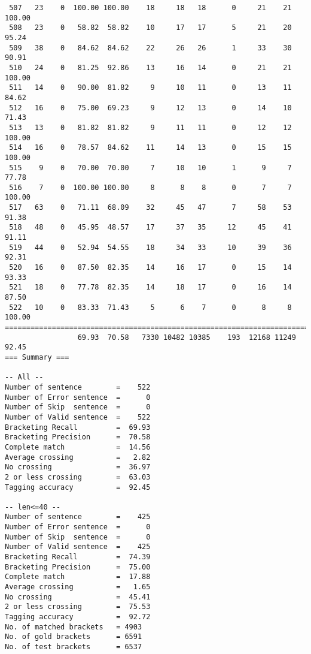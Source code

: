 \begin{verbatim}
 507   23    0  100.00 100.00    18     18   18      0     21    21   100.00
 508   23    0   58.82  58.82    10     17   17      5     21    20    95.24
 509   38    0   84.62  84.62    22     26   26      1     33    30    90.91
 510   24    0   81.25  92.86    13     16   14      0     21    21   100.00
 511   14    0   90.00  81.82     9     10   11      0     13    11    84.62
 512   16    0   75.00  69.23     9     12   13      0     14    10    71.43
 513   13    0   81.82  81.82     9     11   11      0     12    12   100.00
 514   16    0   78.57  84.62    11     14   13      0     15    15   100.00
 515    9    0   70.00  70.00     7     10   10      1      9     7    77.78
 516    7    0  100.00 100.00     8      8    8      0      7     7   100.00
 517   63    0   71.11  68.09    32     45   47      7     58    53    91.38
 518   48    0   45.95  48.57    17     37   35     12     45    41    91.11
 519   44    0   52.94  54.55    18     34   33     10     39    36    92.31
 520   16    0   87.50  82.35    14     16   17      0     15    14    93.33
 521   18    0   77.78  82.35    14     18   17      0     16    14    87.50
 522   10    0   83.33  71.43     5      6    7      0      8     8   100.00
============================================================================
                 69.93  70.58   7330 10482 10385    193  12168 11249    92.45
=== Summary ===

-- All --
Number of sentence        =    522
Number of Error sentence  =      0
Number of Skip  sentence  =      0
Number of Valid sentence  =    522
Bracketing Recall         =  69.93
Bracketing Precision      =  70.58
Complete match            =  14.56
Average crossing          =   2.82
No crossing               =  36.97
2 or less crossing        =  63.03
Tagging accuracy          =  92.45

-- len<=40 --
Number of sentence        =    425
Number of Error sentence  =      0
Number of Skip  sentence  =      0
Number of Valid sentence  =    425
Bracketing Recall         =  74.39
Bracketing Precision      =  75.00
Complete match            =  17.88
Average crossing          =   1.65
No crossing               =  45.41
2 or less crossing        =  75.53
Tagging accuracy          =  92.72
No. of matched brackets   = 4903
No. of gold brackets      = 6591
No. of test brackets      = 6537

\end{verbatim}

\normalsize

